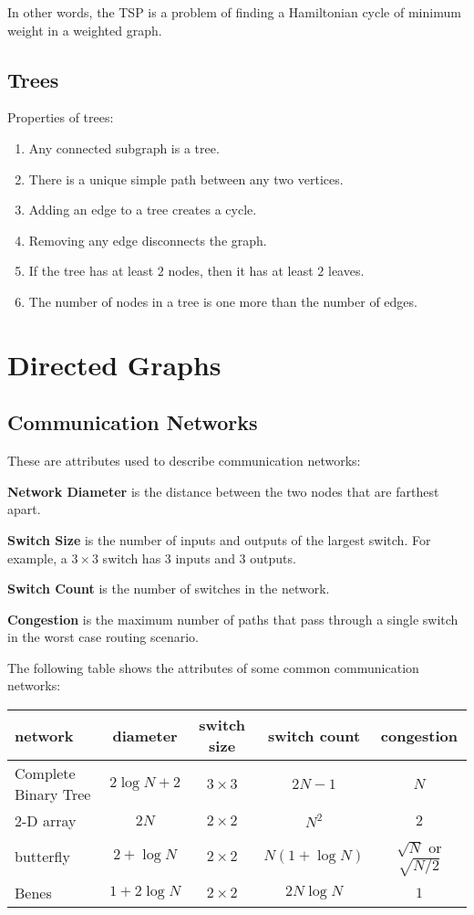\documentclass[../main.tex]{subfiles}
\begin{document}
In other words, the TSP is a problem of finding a Hamiltonian cycle of minimum weight in a weighted graph.

\subsection{Trees}

Properties of trees:

\begin{enumerate}
    \item Any connected subgraph is a tree.
    \item There is a unique simple path between any two vertices.
    \item Adding an edge to a tree creates a cycle.
    \item Removing any edge disconnects the graph.
    \item If the tree has at least $2$ nodes, then it has at least $2$ leaves.
    \item The number of nodes in a tree is one more than the number of edges.
\end{enumerate}

\section{Directed Graphs}

\subsection{Communication Networks}

These are attributes used to describe communication networks:

\textbf{Network Diameter} is the distance between the two nodes that are farthest apart.

\textbf{Switch Size} is the number of inputs and outputs of the largest switch. For example, a $3 \times 3$ switch has $3$ inputs and $3$ outputs.

\textbf{Switch Count} is the number of switches in the network.

\textbf{Congestion} is the maximum number of paths that pass through a single switch in the worst case routing scenario.

The following table shows the attributes of some common communication networks:

\begin{center}
\begin{tabular}{l|c|c|c|c}
network              & diameter      & switch size  & switch count    & congestion \\
\hline
Complete Binary Tree & $2\log N + 2$ & $3 \times 3$ & $2N - 1$        & $N$        \\
\hline
2-D array            & $2N$          & $2 \times 2$ & $N^2$           & $2$        \\
\hline
butterfly            & $2 + \log N$  & $2 \times 2$ & $N(1 + \log N)$ & $\sqrt{N}$ or $\sqrt{N/2}$ \\
\hline
Benes                & $1 + 2\log N$ & $2 \times 2$ & $2N\log N$      & $1$        \\
\end{tabular}
\end{center}
\end{document}
